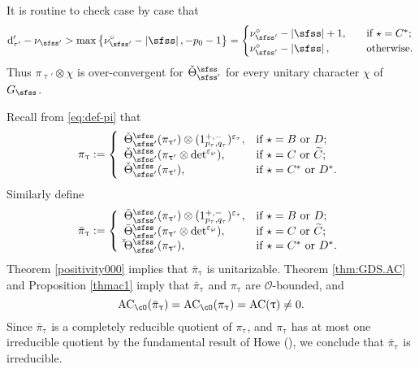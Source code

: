 \documentclass[12pt,a4paper]{amsart}
\def\abs#1{\left|{#1}\right|}
\newcommand{\CO}{{\mathcal {O}}}
\numberwithin{equation}{section}
\theoremstyle{remark}
\def\Thetab{\bar{\Theta}}
\begin{document}
It is routine to check case by case  that 
\[
\mathrm d'_{\tau'}-\nu_{\sfss'}>\max \left \{\nu^\circ_{\sfss'}-\abs{\sfss}, -p_0-1\right \}=
  \begin{cases}
\nu^\circ_{\sfss'}-\abs{\sfss} +1,\quad& \textrm{if $\star =C^*$};\\
 \nu^\circ_{\sfss'}-\abs{\sfss},\quad& \textrm{otherwise}.
   \end{cases}
\]
Thus $\pi_{\uptau'}\otimes \chi$ is over-convergent for $\check \Theta_{\sfss'}^{\sfss}$ for every unitary character $\chi$ of $G_\sfss$. 



Recall from \eqref{eq:def-pi} that 
\[
    \pi_{\uptau}:=\left\{
     \begin{array}{ll}
         \check \Theta_{\sfss'}^{\sfss}(\pi_{\uptau'})\otimes (1_{p_\tau, q_\tau}^{+,-})^{\varepsilon_{\tau}}, &\hbox{if  $\star=B$ or $D$}; \\
         \check \Theta_{\sfss'}^{\sfss}(\pi_{\uptau'}\otimes \det^{\varepsilon_{\wp}}), &\hbox{if $\star=C$ or $\widetilde C$}; \\
              \check \Theta_{\sfss'}^{\sfss}(\pi_{\uptau'}), &\hbox{if $\star=C^*$ or $D^*$}. \\
            \end{array}
   \right.
\]
Similarly define
\[
   \bar \pi_{\uptau}:=\left\{
     \begin{array}{ll}
         \Thetab_{\sfss'}^{\sfss}(\pi_{\uptau'})\otimes (1_{p_\tau, q_\tau}^{+,-})^{\varepsilon_{\tau}}, &\hbox{if  $\star=B$ or $D$}; \\
          \Thetab_{\sfss'}^{\sfss}(\pi_{\uptau'}\otimes \det^{\varepsilon_{\wp}}), &\hbox{if $\star=C$ or $\widetilde C$}; \\
              \check \Thetab_{\sfss'}^{\sfss}(\pi_{\uptau'}), &\hbox{if $\star=C^*$ or $D^*$}. \\
            \end{array}
   \right.
\]
Theorem \ref{positivity000} implies that 
$\bar \pi_{\uptau}$ is unitarizable.  Theorem \ref{thm:GDS.AC} and Proposition \ref{thmac1} imply that $\bar \pi_{\uptau}$ and $\pi_{\uptau}$ are $\CO$-bounded, and 
\[
    \mathrm{AC}_{\cO}( \bar \pi_{\uptau})=\mathrm{AC}_{\cO}(\pi_{\uptau})=\mathrm{AC}(\uptau)\neq 0. 
\]
Since $\bar \pi_{\uptau}$ is a completely reducible quotient of $\pi_{\uptau}$, and $\pi_{\uptau}$ has at most one  irreducible quotient by the fundamental result of Howe (\cite[Theorem 1A]{Howe89}), we conclude that $\bar \pi_{\uptau}$ is irreducible. 
\end{document}
